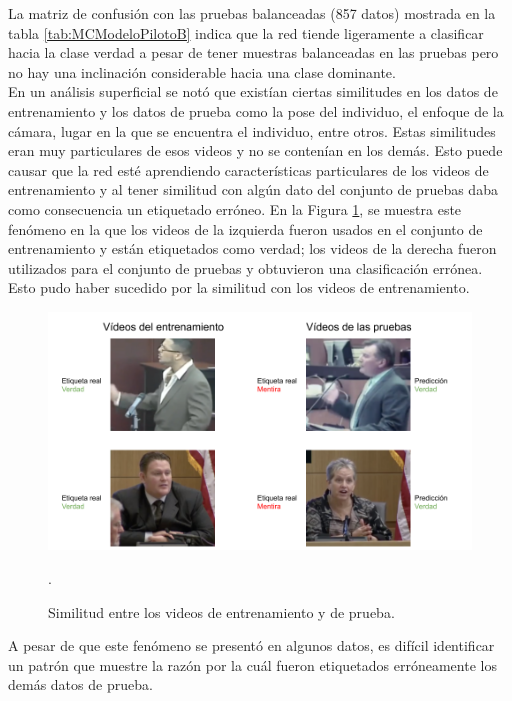 \begin{onehalfspacing}
La matriz de confusión con las pruebas balanceadas (857 datos) mostrada en la tabla \ref{tab:MCModeloPilotoB} indica que la red tiende ligeramente a clasificar hacia la clase verdad a pesar de tener muestras balanceadas en las pruebas pero no hay una inclinación considerable hacia una clase dominante.\\
 
En un análisis superficial se notó que existían ciertas similitudes en los datos de entrenamiento y los datos de prueba como la pose del individuo, el enfoque de la cámara, lugar en la que se encuentra el individuo, entre otros. Estas similitudes eran muy particulares de esos videos y no se contenían en los demás. Esto puede causar que la red esté aprendiendo características particulares de los videos de entrenamiento y al tener similitud con algún dato del conjunto de pruebas daba como consecuencia un etiquetado erróneo. En la Figura \ref{fig:EtiquetadoErroneo}, se muestra este fenómeno en la que los videos de la izquierda fueron usados en el conjunto de entrenamiento y están etiquetados como verdad; los videos de la derecha fueron utilizados para el conjunto de pruebas y obtuvieron una clasificación errónea. Esto pudo haber sucedido por la similitud con los videos de entrenamiento.\\

\begin{figure}[th]
	\centering
	\includegraphics[width=14cm,keepaspectratio]{XX_Figures/EtiquetadoErroneo.png}
	\caption{\footnotesize Similitud entre los videos de entrenamiento y de prueba.}.
	\label{fig:EtiquetadoErroneo}
\end{figure}

A pesar de que este fenómeno se presentó en algunos datos, es difícil identificar un patrón que muestre la razón por la cuál fueron etiquetados erróneamente los demás datos de prueba.\\ 


\end{onehalfspacing}
